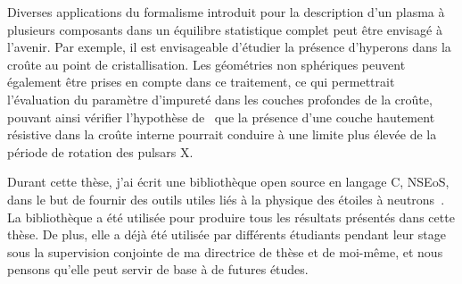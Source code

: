 Diverses applications du formalisme introduit pour la description d'un plasma à
plusieurs composants dans un équilibre statistique complet peut être envisagé 
à l'avenir. 
Par exemple, il est envisageable d'étudier la présence d'hyperons dans la 
croûte au point de cristallisation. 
Les géométries non sphériques peuvent également être prises en compte dans ce
traitement, ce qui permettrait l'évaluation du paramètre d'impureté dans les 
couches profondes de la croûte, pouvant ainsi vérifier l'hypothèse 
de~\cite{Pons2013} que la présence d'une couche hautement résistive dans la 
croûte interne pourrait conduire à une limite plus élevée de la période de 
rotation des pulsars X.

Durant cette thèse, j'ai écrit une bibliothèque open source en langage C,
NSEoS, dans le but de fournir des outils utiles liés à la physique des étoiles 
à neutrons~\cite{NSEoS}. La bibliothèque a été utilisée pour produire tous les 
résultats présentés dans cette thèse.
De plus, elle a déjà été utilisée par différents étudiants pendant leur stage 
sous la supervision conjointe de ma directrice de thèse et de moi-même, et 
nous pensons qu'elle peut servir de base à de futures études.
